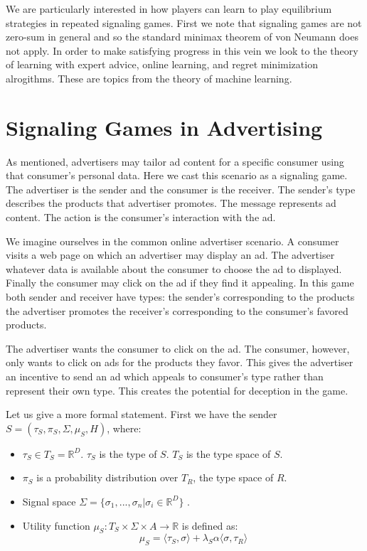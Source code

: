 \documentclass{article}
\begin{document}
We are particularly interested in how players can learn to play equilibrium strategies in repeated signaling games. First we note that signaling games are not zero-sum in general and so the standard minimax theorem of von Neumann does not apply. In order to make satisfying progress in this vein we look to the theory of learning with expert advice, online learning, and regret minimization alrogithms. These are topics from the theory of machine learning.

\section{Signaling Games in Advertising}

As mentioned, advertisers may tailor ad content for a specific consumer using that consumer's personal data. Here we cast this scenario as a signaling game. The advertiser is the sender and the consumer is the receiver. The sender's type describes the products that advertiser promotes. The message represents ad content. The action is the consumer's interaction with the ad.

We imagine ourselves in the common online advertiser scenario. A consumer visits a web page on which an advertiser may display an ad. The advertiser whatever data is available about the consumer to choose the ad to displayed. Finally the consumer may click on the ad if they find it appealing. In this game both sender and receiver have types: the sender's corresponding to the products the advertiser promotes the receiver's corresponding to the consumer's favored products.

The advertiser wants the consumer to click on the ad. The consumer, however, only wants to click on ads for the products they favor. This gives the advertiser an incentive to send an ad which appeals to consumer's type rather than represent their own type. This creates the potential for deception in the game.

Let us give a more formal statement. First we have the sender $S = (\tau_S, \pi_S, \Sigma, \mu_S, H)$, where:
\begin{itemize}
    \item $\tau_S \in T_S = \mathbb{R}^D$. $\tau_S$ is the type of $S$. $T_S$ is the type space of $S$.
    \item $\pi_S$ is a probability distribution over $T_R$, the type space of $R$.
    \item Signal space $\Sigma = \lbrace \sigma_1, ..., \sigma_n \vert \sigma_i \in \mathbb{R}^D \rbrace$ .
    \item Utility function $\mu_S: T_S \times \Sigma \times A \rightarrow \mathbb{R}$ is defined as:
    \begin{equation}
        \mu_S = \langle \tau_S, \sigma \rangle + \lambda_S \alpha \langle \sigma, \tau_R \rangle
    \end{equation}
\end{itemize}
\end{document}
